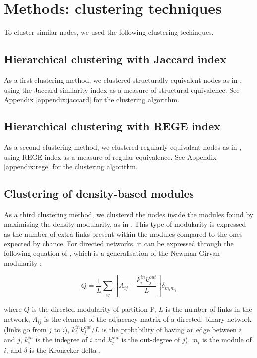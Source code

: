 \section*{Methods: clustering techniques}

	To cluster similar nodes, we used the following clustering techinques.

	\subsection*{Hierarchical clustering with Jaccard index}

		As a first clustering method, we clustered structurally equivalent nodes as in \citet{Yodzis1999}, using the Jaccard similarity index as a measure of structural equivalence. See Appendix \ref{appendix:jaccard} for the clustering algorithm.

	\subsection*{Hierarchical clustering with REGE index}

		As a second clustering method, we clustered regularly equivalent nodes as in \citet{Luczkovich2003}, using REGE index as a measure of regular equivalence. See Appendix \ref{appendix:rege} for the clustering algorithm.

	\subsection*{Clustering of density-based modules}

		As a third clustering method, we clustered the nodes inside the modules found by maximising the density-modularity, as in \citet{Guimera2010}. This type of modularity is expressed as the number of extra links present within the modules compared to the ones expected by chance. For directed networks, it can be expressed through the following equation of \citet{Arenas2007}, which is a generalisation of the Newman-Girvan modularity \citep{Newman2004}:

						\begin{equation}
							Q=\frac{1}{L}\sum\limits_{ij}[A_{ij}-\frac{k_i^{in}k_j^{out}}{L}]\delta_{m_im_j} \label{eqn:modularitydensity}
						\end{equation}

		\noindent where $Q$ is the directed modularity of partition P, $L$ is the number of links in the network, $A_{ij}$ is the element of the adjacency matrix of a directed, binary network (links go from $j$ to $i$), $k_i^{in}k_j^{out}/L$ is the probability of having an edge between $i$ and $j$, $k^{in}_i$ is the indegree of $i$ and $k^{out}_j$ is the out-degree of $j$), $ m_i$ is the module of $i$, and $\delta$ is the Kronecker delta \citep{Kozen2007}.

